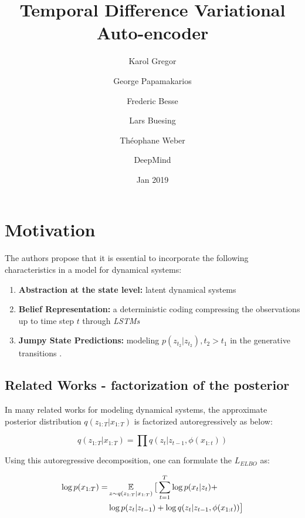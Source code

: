 \documentclass[10pt,twocolumn,letterpaper]{article}
\begin{document}
	
	\title{Temporal Difference Variational Auto-encoder}
	\author{Karol Gregor \and George Papamakarios \and Frederic Besse \and Lars Buesing \and Théophane Weber \and DeepMind}
	\date{Jan 2019}
	
	\maketitle

	\section{Motivation}
	The authors propose that it is essential to incorporate the following characteristics in a model for dynamical systems:
	\begin{enumerate}[label=\textbf{\arabic*},ref=\arabic*]
		\item \textbf{Abstraction at the state level: } latent dynamical systems
		\item \textbf{Belief Representation: } a deterministic coding compressing the observations up to time step $t$ through \emph{LSTMs}
		\item \textbf{Jumpy State Predictions: }modeling $p(z_{t_2}|z_{t_2}), t_2>t_1 $ in the generative transitions \label{mot:jumpy}.
	\end{enumerate}
	
	\subsection{Related Works - factorization of the posterior}
	
	In many related works for modeling dynamical systems, the approximate posterior distribution $q(z_{1:T}|x_{1:T})$ is factorized autoregressively as below:
	
	\begin{equation}
	q(z_{1:T}|x_{1:T}) = \prod{q(z_t|z_{t-1}, \phi(x_{1:t}))}
	\end{equation}
	
	Using this autoregressive decomposition, one can formulate the $L_{ELBO}$ as:
	
	\begin{equation}	
	\begin{split}
	\log p(x_{1:T}) = &\operatorname*{\mathbb{E}}_{z \sim q(z_{1:T}|x_{1:T})} \big[\sum_{t=1}^{T} \log p(x_t|z_t) + \\ &\log p(z_t|z_{t-1}) + \log q(z_t|z_{t-1},\phi(x_{1:t}))\big] 
	\end{split} 
	\end{equation}
	
\end{document}
